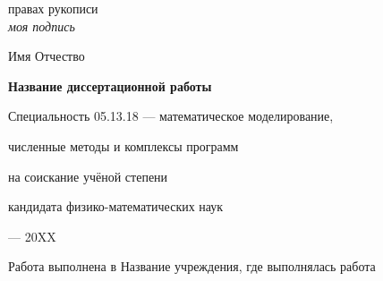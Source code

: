 \newcommand{\sfs}{\fontsize{14pt}{15pt}\selectfont}
\sfs %
\thispagestyle{empty}

\vspace{10mm}
\begin{flushright}
   правах рукописи \\
  \textit{моя подпись}
\end{flushright}

\vspace{30mm}
\begin{center}
{\Large{} Имя Отчество}
\end{center}

\vspace{30mm}
\begin{center}
{\bf \LARGE Название диссертационной работы
\par}

\vspace{30mm}
{\Large
Специальность 05.13.18 --- математическое моделирование,\par
численные методы и комплексы программ
}

\vspace{15mm}
\par
{} на соискание учёной степени\par
кандидата физико-математических наук
\end{center}

\vspace{40mm}
\begin{center}
{ --- 20XX}
\end{center}

\newpage
\thispagestyle{empty}
\noindent Работа выполнена в Название учреждения, где выполнялась работа

